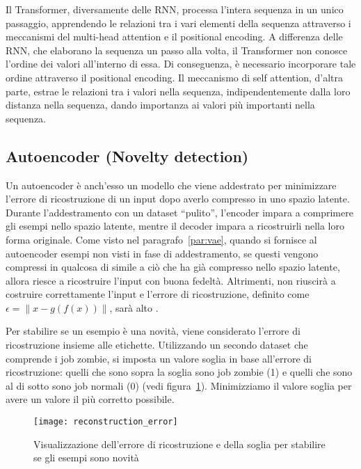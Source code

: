 Il Transformer, diversamente delle RNN, processa l'intera sequenza in un unico
passaggio, apprendendo le relazioni tra i vari elementi della sequenza
attraverso i meccanismi del multi-head attention e il positional encoding. A
differenza delle RNN, che elaborano la sequenza un passo alla volta, il
Transformer non conosce l'ordine dei valori all'interno di essa. Di
conseguenza, è necessario incorporare tale ordine attraverso il positional
encoding. Il meccanismo di self attention, d'altra parte, estrae le relazioni
tra i valori nella sequenza, indipendentemente dalla loro distanza nella
sequenza, dando importanza ai valori più importanti nella sequenza.

\subsection{Autoencoder (Novelty detection)}

Un autoencoder è anch'esso un modello che viene addestrato per minimizzare
l'errore di ricostruzione di un input dopo averlo compresso in uno spazio
latente. Durante l'addestramento con un dataset ``pulito'', l'encoder impara a
comprimere gli esempi nello spazio latente, mentre il decoder impara a
ricostruirli nella loro forma originale. Come visto nel
paragrafo~\ref{par:vae}, quando si fornisce al autoencoder esempi non visti in
fase di addestramento, se questi vengono compressi in qualcosa di simile a ciò
che ha già compresso nello spazio latente, allora riesce a ricostruire l'input
con buona fedeltà. Altrimenti, non riuscirà a costruire correttamente l'input
e l'errore di ricostruzione, definito come $\epsilon=\lVert x-g(f(x))\rVert$,
sarà alto \cite{borghesi2019}.

Per stabilire se un esempio è una novità, viene considerato l'errore di
ricostruzione insieme alle etichette. Utilizzando un secondo dataset che
comprende i job zombie, si imposta un valore soglia in base all'errore di
ricostruzione: quelli che sono sopra la soglia sono job zombie (1) e quelli
che sono al di sotto sono job normali (0) (vedi
figura~\ref{fig:reconstruction_error}). Minimizziamo il valore soglia per
avere un valore il più corretto possibile.

\begin{figure}[!ht]
    \centering
    \texttt{[image: reconstruction\_error]}
    \caption{Visualizzazione dell'errore di ricostruzione e della soglia per
    stabilire se gli esempi sono novità}
    \label{fig:reconstruction_error}
\end{figure}


